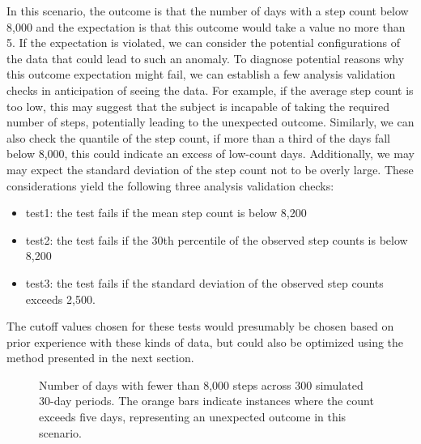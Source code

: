 \documentclass[
  12pt,
]{interact}
\providecommand{\tightlist}{%
  \setlength{\itemsep}{0pt}\setlength{\parskip}{0pt}}\usepackage{longtable,booktabs,array}
\begin{document}
In this scenario, the outcome is that the number of days with a step
count below 8,000 and the expectation is that this outcome would take a
value no more than 5. If the expectation is violated, we can consider
the potential configurations of the data that could lead to such an
anomaly. To diagnose potential reasons why this outcome expectation
might fail, we can establish a few analysis validation checks in
anticipation of seeing the data. For example, if the average step count
is too low, this may suggest that the subject is incapable of taking the
required number of steps, potentially leading to the unexpected outcome.
Similarly, we can also check the quantile of the step count, if more
than a third of the days fall below 8,000, this could indicate an excess
of low-count days. Additionally, we may may expect the standard
deviation of the step count not to be overly large. These considerations
yield the following three analysis validation checks:

\begin{itemize}
\tightlist
\item
  test1: the test fails if the mean step count is below 8,200
\item
  test2: the test fails if the 30th percentile of the observed step
  counts is below 8,200
\item
  test3: the test fails if the standard deviation of the observed step
  counts exceeds 2,500.
\end{itemize}

The cutoff values chosen for these tests would presumably be chosen
based on prior experience with these kinds of data, but could also be
optimized using the method presented in the next section.

\label{cell-fig-step-count}
\begin{figure}[H]


\caption{\label{fig-step-count}Number of days with fewer than 8,000
steps across 300 simulated 30-day periods. The orange bars indicate
instances where the count exceeds five days, representing an unexpected
outcome in this scenario.}

\end{figure}%
\end{document}
